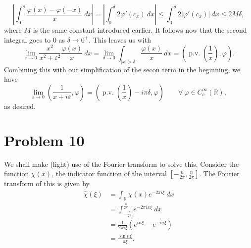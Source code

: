 \documentclass[10pt]{amsart}
\theoremstyle{thmstyle}
\theoremstyle{defstyle}
\newcommand{\R}{\mathbb{R}}
\newcommand{\wh}[1]{\widehat{#1}}
\renewcommand{\le}{\leqslant}
\newcommand{\pv}{\operatorname{p.v.}}
\begin{document}
\begin{equation*}
	\left|\int_0^\delta\frac{\varphi(x) - \varphi(-x)}{x}~dx\right| = \left|\int_0^\delta 2\varphi'(c_x)~dx\right|\le\int_0^\delta 2|\varphi'(c_x)|~dx\le 2M\delta,
\end{equation*}
where $M$ is the same constant introduced earlier. It follows now that the second integral goes to $0$ as $\delta\to 0^+$. This leaves us with 
\begin{equation*}
	\lim_{\varepsilon\to 0}\frac{x^2}{x^2 + \varepsilon^2}\frac{\varphi(x)}{x}~dx = \lim_{\delta\to 0}\int_{|x| > \delta}\frac{\varphi(x)}{x}~dx = \left(\pv\left(\frac{1}{x}\right),\varphi\right).
\end{equation*}
Combining this with our simplification of the secon term in the beginning, we have 
\begin{equation*}
	\lim_{\varepsilon\to 0}\left(\frac{1}{x + i\varepsilon},\varphi\right) = \left(\pv\left(\frac{1}{x}\right) - i\pi\delta, \varphi\right)\qquad\forall~\varphi\in C_c^\infty(\R),
\end{equation*}
as desired.



\section{Problem 10}

We shall make (light) use of the Fourier transform to solve this. Consider the function $\chi(x)$, the indicator function of the interval $\left[-\frac{n}{2\pi}, \frac{n}{2\pi}\right]$. The Fourier transform of this is given by 
\begin{align*}
	\wh\chi(\xi) &= \int_{\R}\chi(x)e^{-2\pi i\xi}~dx\\
	&= \int_{-\frac{n}{2\pi}}^\frac{n}{2\pi} e^{-2\pi ix\xi}~dx\\
	&= \frac{1}{2\pi i\xi}\left(e^{in\xi} - e^{-in\xi}\right)\\
	&= \frac{\sin n\xi}{\pi\xi}.
\end{align*}
\end{document}
